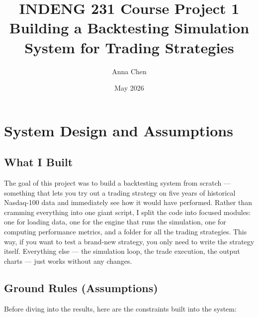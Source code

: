 \documentclass[11pt,a4paper]{article}
\title{\textbf{INDENG 231 Course Project 1}\\[0.4em]
\large Building a Backtesting Simulation System for Trading Strategies}
\author{Anna Chen}
\date{May 2026}
\begin{document}
\maketitle
\tableofcontents
\newpage

\section{System Design and Assumptions}

\subsection{What I Built}

The goal of this project was to build a backtesting system from scratch --- something
that lets you try out a trading strategy on five years of historical Nasdaq-100 data
and immediately see how it would have performed.
Rather than cramming everything into one giant script, I split the code into focused
modules: one for loading data, one for the engine that runs the simulation, one for
computing performance metrics, and a folder for all the trading strategies.
This way, if you want to test a brand-new strategy, you only need to write the strategy
itself. Everything else --- the simulation loop, the trade execution, the output charts ---
just works without any changes.

\subsection{Ground Rules (Assumptions)}

Before diving into the results, here are the constraints built into the system:
\end{document}
